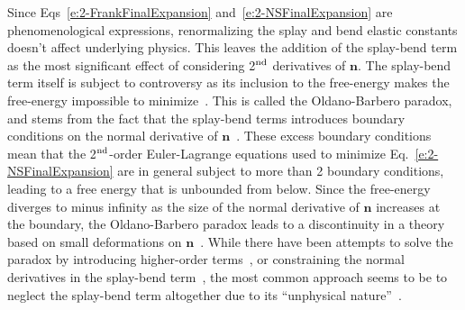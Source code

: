 Since Eqs~\ref{e:2-FrankFinalExpansion} and~\ref{e:2-NSFinalExpansion} are phenomenological expressions, renormalizing the splay and bend elastic constants doesn't affect underlying physics.
This leaves the addition of the splay-bend term as the most significant effect of considering 2$^\textup{nd}$ derivatives of $\mathbf{n}$.
The splay-bend term itself is subject to controversy as its inclusion to the free-energy makes the free-energy impossible to minimize~\cite{RN214,RN215,RN216}.
This is called the Oldano-Barbero paradox, and stems from the fact that the splay-bend terms introduces boundary conditions on the normal derivative of $\mathbf{n}$~\cite{RN216,RN220,RN219,RN221}.
These excess boundary conditions mean that the 2$^\textup{nd}$-order Euler-Lagrange equations used to minimize Eq.~\ref{e:2-NSFinalExpansion} are in general subject to more than 2 boundary conditions, leading to a free energy that is unbounded from below.
Since the free-energy diverges to minus infinity as the size of the normal derivative of $\mathbf{n}$ increases at the boundary, the Oldano-Barbero paradox leads to a discontinuity in a theory based on small deformations on $\mathbf{n}$~\cite{RN219}.
While there have been attempts to solve the paradox by introducing higher-order terms~\cite{RN220}, or constraining the normal derivatives in the splay-bend term~\cite{RN221}, the most common approach seems to be to neglect the splay-bend term altogether due to its ``unphysical nature''~\cite{RN55,RN222}.

